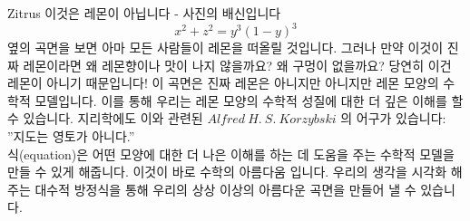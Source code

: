 \begin{surferPage}{Zitrus}
이것은 레몬이 아닙니다 - 사진의 배신입니다\\
\smallskip
\[x^2 + z^2 = y^3 (1 - y)^3\] 
\singlespacing
옆의 곡면을 보면 아마 모든 사람들이 레몬을 떠올릴 것입니다. 그러나 만약 이것이 진짜 레몬이라면 왜 레몬향이나 맛이 나지 않을까요? 왜 구멍이 없을까요? 당연히 이건 레몬이 아니기 때문입니다! 
\singlespacing
이 곡면은 진짜 레몬은 아니지만 아니지만 레몬 모양의 수학적 모델입니다.  이를 통해 우리는 레몬 모양의 수학적 성질에 대한 더 깊은 이해를 할 수 있습니다. 지리학에도 이와 관련된 $Alfred\ H.\ S.\ Korzybski$ 의 어구가 있습니다: ''지도는 영토가 아니다.'' \\
\singlespacing
식(equation)은 어떤 모양에 대한 더 나은 이해를 하는 데 도움을 주는 수학적 모델을 만들 수 있게 해줍니다. 
\singlespacing
이것이 바로 수학의 아름다움 입니다. 우리의 생각을 시각화 해주는 대수적 방정식을 통해 우리의 상상 이상의 아름다운 곡면을 만들어 낼 수 있습니다.
\end{surferPage}
